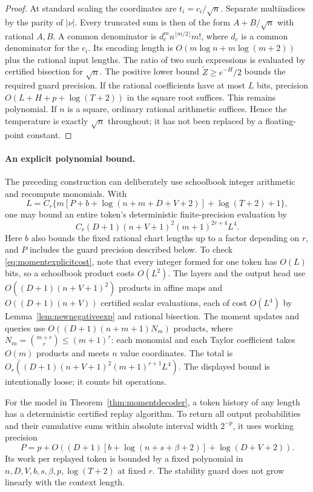 \begin{proof}
At standard scaling the coordinates are $t_i=c_i/\sqrt n$.
Separate multiindices by the parity of $|\nu|$.  Every truncated
sum is then of the form $A+B/\sqrt n$ with rational $A,B$.
A common denominator is
$d_c^m n^{\lfloor m/2\rfloor}m!$, where $d_c$ is a common
denominator for the $c_i$.  Its encoding length is
$O(m\log n+m\log(m+2))$ plus the rational input lengths.
The ratio of two such expressions is evaluated by certified
bisection for $\sqrt n$.  The positive lower bound
$\widetilde Z\ge e^{-H}/2$ bounds the required guard precision.
If the rational coefficients have at most $L$ bits, precision
$O(L+H+p+\log(T+2))$ in the square root suffices.  This remains
polynomial.  If $n$ is a square, ordinary rational arithmetic
suffices.  Hence the temperature is exactly $\sqrt n$ throughout;
it has not been replaced by a floating-point constant.
\end{proof}

\paragraph{An explicit polynomial bound.}
The preceding construction can deliberately use schoolbook integer
arithmetic and recompute monomials.  With
\[
 L=C_r\{m[P+b+\log(n+m+D+V+2)]+\log(T+2)+1\},
\]
one may bound an entire token's deterministic finite-precision
evaluation by
\begin{equation}
 C_r(D+1)(n+V+1)^2(m+1)^{2r+4}L^4.
 \label{eq:momentexplicitcost}
\end{equation}
Here $b$ also bounds the fixed rational chart lengths up to a
factor depending on $r$, and $P$ includes the guard precision
described below.  To check \eqref{eq:momentexplicitcost}, note
that every integer formed for one token has $O(L)$ bits, so a
schoolbook product costs $O(L^2)$.  The layers and the output head
use $O((D+1)(n+V+1)^2)$ products in affine maps and $O((D+1)(n+V))$
certified scalar evaluations, each of cost $O(L^4)$ by
Lemma~\ref{lem:newnegativeexp} and rational bisection.  The moment
updates and queries use $O((D+1)(n+m+1)N_m)$ products, where
$N_m=\binom{m+r}{r}\le(m+1)^r$: each monomial and each Taylor
coefficient takes $O(m)$ products and meets $n$ value coordinates.  The total is
$O_r((D+1)(n+V+1)^2(m+1)^{r+1}L^4)$.  The displayed bound is
intentionally loose; it counts bit operations.

\begin{lemma}
\label{lem:prefixstability}
For the model in Theorem~\ref{thm:momentdecoder}, a token history
of any length has a deterministic certified replay algorithm.  To
return all output probabilities and their cumulative sums within
absolute interval width $2^{-p}$, it uses working precision
\[
 P=p+O\!\left((D+1)[b+\log(n+s+\beta+2)]
                 +\log(D+V+2)\right).
\]
Its work per replayed token is bounded by a fixed polynomial in
$n,D,V,b,s,\beta,p,\log(T+2)$ at fixed $r$.  The stability guard
does not grow linearly with the context length.
\end{lemma}

